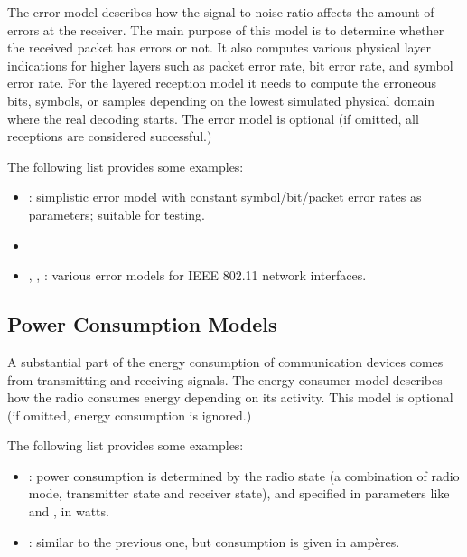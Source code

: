 The error model describes how the signal to noise ratio affects the amount of
errors at the receiver. The main purpose of this model is to determine whether
the received packet has errors or not. It also computes various physical
layer indications for higher layers such as packet error rate, bit error rate,
and symbol error rate. For the layered reception model it needs to compute the
erroneous bits, symbols, or samples depending on the lowest simulated physical
domain where the real decoding starts. The error model is optional (if omitted,
all receptions are considered successful.)

The following list provides some examples:

\begin{itemize}
  \item {}: simplistic error model with constant
    symbol/bit/packet error rates as parameters; suitable for testing. 
  \item {} 
  \item {}, , 
    : various error models for IEEE 802.11
    network interfaces.
\end{itemize}

\subsection{Power Consumption Models}

A substantial part of the energy consumption of communication devices comes from
transmitting and receiving signals. The energy consumer model describes how the
radio consumes energy depending on its activity. This model is optional (if
omitted, energy consumption is ignored.) 

The following list provides some examples:

\begin{itemize}
  \item {}: power consumption is
    determined by the radio state (a combination of radio mode, 
    transmitter state and receiver state), and specified in 
    parameters like  and 
    , in watts.
  \item {}: similar to the previous
    one, but consumption is given in amp\`eres.
\end{itemize}

